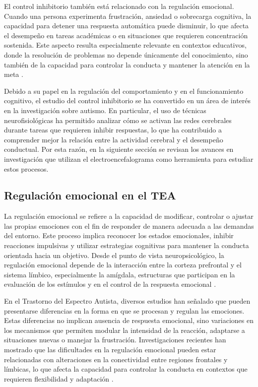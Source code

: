 \documentclass{book}
\begin{document}
El control inhibitorio también está relacionado con la regulación emocional. Cuando una persona experimenta frustración, ansiedad o sobrecarga cognitiva, la capacidad para detener una respuesta automática puede disminuir, lo que afecta el desempeño en tareas académicas o en situaciones que requieren concentración sostenida. Este aspecto resulta especialmente relevante en contextos educativos, donde la resolución de problemas no depende únicamente del conocimiento, sino también de la capacidad para controlar la conducta y mantener la atención en la meta \cite{Diamond2013}.

Debido a su papel en la regulación del comportamiento y en el funcionamiento cognitivo, el estudio del control inhibitorio se ha convertido en un área de interés en la investigación sobre autismo. En particular, el uso de técnicas neurofisiológicas ha permitido analizar cómo se activan las redes cerebrales durante tareas que requieren inhibir respuestas, lo que ha contribuido a comprender mejor la relación entre la actividad cerebral y el desempeño conductual. Por esta razón, en la siguiente sección se revisan los avances en investigación que utilizan el electroencefalograma como herramienta para estudiar estos procesos.

\subsection{Regulación emocional en el TEA}

La regulación emocional se refiere a la capacidad de modificar, controlar o ajustar las propias emociones con el fin de responder de manera adecuada a las demandas del entorno. Este proceso implica reconocer los estados emocionales, inhibir reacciones impulsivas y utilizar estrategias cognitivas para mantener la conducta orientada hacia un objetivo. Desde el punto de vista neuropsicológico, la regulación emocional depende de la interacción entre la corteza prefrontal y el sistema límbico, especialmente la amígdala, estructuras que participan en la evaluación de los estímulos y en el control de la respuesta emocional \cite{Gross1998, Uddin2013}.

En el Trastorno del Espectro Autista, diversos estudios han señalado que pueden presentarse diferencias en la forma en que se procesan y regulan las emociones. Estas diferencias no implican ausencia de respuesta emocional, sino variaciones en los mecanismos que permiten modular la intensidad de la reacción, adaptarse a situaciones nuevas o manejar la frustración. Investigaciones recientes han mostrado que las dificultades en la regulación emocional pueden estar relacionadas con alteraciones en la conectividad entre regiones frontales y límbicas, lo que afecta la capacidad para controlar la conducta en contextos que requieren flexibilidad y adaptación \cite{Mazefsky2013, Uddin2013}.
\end{document}
